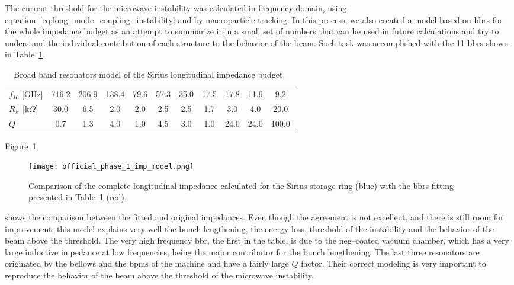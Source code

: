     The current threshold for the microwave instability was calculated in frequency domain, using equation~\eqref{eq:long_mode_coupling_instability} and by macroparticle tracking. In this process, we also created a model based on \glspl{bbr} for the whole impedance budget as an attempt to summarize it in a small set of numbers that can be used in future calculations and try to understand the individual contribution of each structure to the behavior of the beam. Such task was accomplished with the \num{11} \glspl{bbr} shown in Table~\ref{tab:resonator_model}.
    \begin{table}
        \centering
        \caption{Broad band resonators model of the Sirius longitudinal impedance budget.}
        \label{tab:resonator_model}
        \begin{tabular}{l *{10}{c}}
            \toprule
            $f_R$~[GHz]       & 716.2 & 206.9  & 138.4  &  79.6  &  57.3
            &  35.0 &  17.5  & 17.8   &  11.9  &   9.2 \\
            $R_s$~[k$\Omega$] & 30.0  &  6.5   &  2.0   &  2.0   &  2.5
            &  2.5  &  1.7   &  3.0   &  4.0   &  20.0 \\
            $Q$               &  0.7  &  1.3   &  4.0   &  1.0   &   4.5
            &  3.0  &  1.0   & 24.0   &  24.0  &  100.0 \\
            \bottomrule
        \end{tabular}
    \end{table}
    Figure~\ref{fig:ph1_imp_model_comp}
    \begin{figure}
        \centering
        \texttt{[image: official\_phase\_1\_imp\_model.png]}
        \caption[Fitting of the impedance budget of the storage ring.]{Comparison of the complete longitudinal impedance calculated for the Sirius storage ring (blue) with the \glspl{bbr} fitting presented in Table~\ref{tab:resonator_model} (red).}
        \label{fig:ph1_imp_model_comp}
    \end{figure}
    shows the comparison between the fitted and original impedances. Even though the agreement is not excellent, and there is still room for improvement, this model explains very well the bunch lengthening, the energy loss, threshold of the instability and the behavior of the beam above the threshold. The very high frequency \gls{bbr}, the first in the table, is due to the \gls{neg}--coated vacuum chamber, which has a very large inductive impedance at low frequencies, being the major contributor for the bunch lengthening. The last three resonators are originated by the bellows and the \glspl{bpm} of the machine and have a fairly large $Q$ factor. Their correct modeling is very important to reproduce the behavior of the beam above the threshold of the microwave instability.

